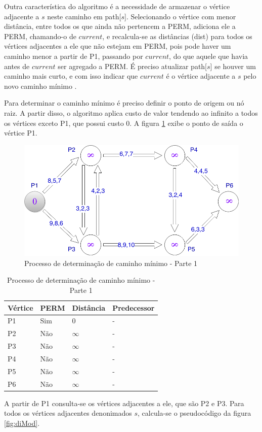 Outra característica do algoritmo é a necessidade de armazenar o vértice adjacente
a $s$ neste caminho em path[$s$]. Selecionando o vértice com menor distância, entre todos os que ainda não pertencem
a PERM, adiciona ele a PERM, chamando-o de $current$, e recalcula-se as distâncias (dist) para todos os vértices
adjacentes a ele que não estejam em PERM, pois pode haver um caminho menor a partir de P1, passando por $current$, 
do que aquele que havia antes de $current$ ser agregado a PERM. É preciso atualizar path[$s$] se houver um caminho
mais curto, e com isso indicar que $current$ é o vértice adjacente a $s$ pelo novo caminho mínimo \cite{leonard}.

Para determinar o caminho mínimo é preciso definir o ponto de origem ou nó raiz. A partir disso, o algoritmo
aplica custo de valor tendendo ao infinito a todos os vértices exceto P1, que possui custo 0. A figura \ref{fig:leo2} exibe
o ponto de saída o vértice P1.

\begin{figure}[htbp]
\centering
 \includegraphics[width=.50\textwidth]{chapters/fig/leo2.png}
\caption{Processo de determinação de caminho mínimo - Parte 1}
\label{fig:leo2}
\end{figure}

\begin{table}[htbp]
	\centering
	\begin{tabular}{l l l l}
	\toprule
	Vértice & PERM & Distância & Predecessor\\
	\midrule
	P1 & Sim & 0 & - \\
	P2 & Não & $\infty$ & - \\
	P3 & Não & $\infty$ & - \\
	P4 & Não & $\infty$ & - \\
	P5 & Não & $\infty$ & - \\
	P6 & Não & $\infty$ & - \\
	\bottomrule
	\end{tabular}
\caption{Processo de determinação de caminho mínimo - Parte 1}
 \label{tab:leotab1}
\end{table}
\FloatBarrier

A partir de P1 consulta-se os vértices adjacentes a ele, que são P2 e P3. Para todos os vértices
adjacentes denonimados $s$, calcula-se o pseudocódigo da figura \ref{fig:diMod}.

